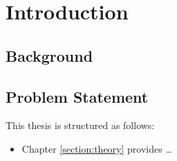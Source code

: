 \chapter{Introduction}
\label{chapter:Introduction}

\section{Background}


\section{Problem Statement}

This thesis is structured as follows:
\begin{itemize}
	
\item Chapter \ref{section:theory} provides \dots

\end{itemize}





